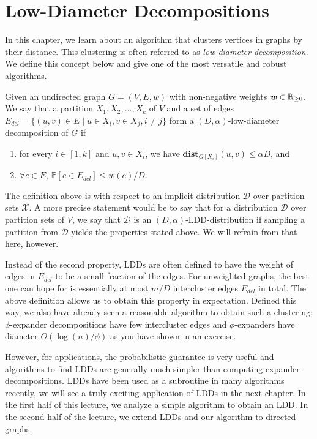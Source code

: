 
\chapter{Low-Diameter Decompositions}

In this chapter, we learn about an algorithm that clusters vertices in graphs by their distance. This clustering is often referred to as \emph{low-diameter decomposition}. We define this concept below and give one of the most versatile and robust algorithms.

\begin{definition}
Given an undirected graph $G = (V,E,w)$ with non-negative weights $\boldsymbol{\mathit{w}} \in \mathbb{R}_{\geq 0}$. We say that a partition $X_1, X_2, \ldots, X_k$ of $V$ and a set of edges $E_{del} = \{ (u,v) \in E \;|\; u \in X_i, v \in X_j, i \neq j\}$ form a $(D, \alpha)$-low-diameter decomposition of $G$ if
\begin{enumerate}
\item for every $i \in [1, k]$ and $u,v \in X_i$, we have $\mathbf{dist}_{G[X_i]}(u,v) \leq \alpha D$, and
\item $\forall e \in E$, $\mathbb{P}[e \in E_{del}] \leq w(e)/ D$.
\end{enumerate}
\end{definition}
\begin{remark}
The definition above is with respect to an implicit distribution $\mathcal{D}$ over partition sets $\mathcal{X}$. A more precise statement would be to say that for a distribution $\mathcal{D}$ over partition sets of $V$, we say that $\mathcal{D}$ is an $(D, \alpha)$-LDD-distribution if sampling a partition from $\mathcal{D}$ yields the properties stated above. We will refrain from that here, however.
\end{remark}
\begin{remark}
Instead of the second property, LDDs are often defined to have the weight of edges in $E_{del}$ to be a small fraction of the edges. For unweighted graphs, the best one can hope for is essentially at most $m/D$ intercluster edges $E_{del}$ in total. The above definition allows us to obtain this property in expectation. Defined this way, we also have already seen a reasonable algorithm to obtain such a clustering: $\phi$-expander decompositions have few intercluster edges and $\phi$-expanders have diameter $O(\log(n)/\phi)$ as you have shown in an exercise.
\end{remark}

However, for applications, the probabilistic guarantee is very useful and algorithms to find LDDs are generally much simpler than computing expander decompositions. LDDs have been used as a subroutine in many algorithms recently, we will see a truly exciting application of LDDs in the next chapter. In the first half of this lecture, we analyze a simple algorithm to obtain an LDD. In the second half of the lecture, we extend LDDs and our algorithm to directed graphs.

